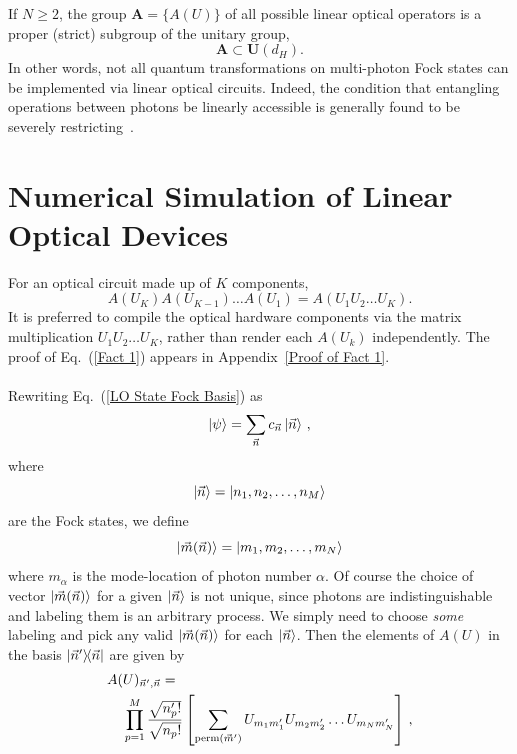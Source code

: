 \documentclass[aps,pra,twocolumn,superscriptaddress,floatfix,10pt]{revtex4}
\begin{document}
If $N \ge 2$, the group $\textbf{A}=\{ A(U) \}$  of all possible linear optical operators is a proper (strict) subgroup of the unitary group,
\begin{equation}
\label{Proper Subgroup}
\textbf{A} \subset \textbf{U}(d_H).
\end{equation}
In other words, not all quantum transformations on multi-photon Fock states can be implemented via linear optical circuits. Indeed, the condition that entangling operations between photons be linearly accessible is  generally found to be severely restricting~\cite{Matt Smith,Braunstein,Jake Smith,Lougovski,Lutkenhaus,Carollo,Pavicic}. 
\section{Numerical Simulation of Linear Optical Devices}
\label{Section on Protocol}
For an optical circuit made up of $K$ components,
\begin{equation}
	\label{Fact 1}
A(U_K) A(U_{K-1}) \dots A(U_1) = A(U_1 U_2 \dots U_K).
\end{equation}
It is preferred to compile the optical hardware components via the matrix multiplication $U_1 U_2 \dots U_K$, rather than render each $A(U_k)$ independently. The proof of Eq.~(\ref{Fact 1}) appears in Appendix~\ref{Proof of Fact 1}.
\\ \\ \indent
Rewriting Eq.~(\ref{LO State Fock Basis}) as
\begin{equation}
\label{LO State Fock Vec Basis}
\ket{\psi} = \sum_{\vec{n}} c_{\vec{n}} \ket{\vec{n}} \,,
\end{equation}
where
\begin{equation}
\ket{\vec{n}} = \ket{n_1,n_2,\dots,n_M}
\end{equation}
are the Fock states, we define
\begin{equation}
\label{m definition}
\ket{\vec{m}(\vec{n})} = \ket{m_1,m_2,\dots,m_N}
\end{equation}
where $m_\alpha$ is the mode-location of photon number $\alpha$. Of course the choice of vector $\ket{\vec{m}(\vec{n})}$ for a given $\ket{\vec{n}}$ is not unique, since photons are indistinguishable and labeling them is an arbitrary process. We simply need to choose \textit{some} labeling and pick any valid $\ket{\vec{m}(\vec{n})}$ for each $\ket{\vec{n}}$. Then the elements of $A(U)$ in the basis $\outerproduct{\vec{n}^\prime}{\vec{n}}$ are given by
\begin{eqnarray}
\label{Fact 2}
A(U)_{\vec{n}^\prime,\vec{n}} = \quad \quad \quad \quad \quad \quad \quad \quad \quad \quad \quad \quad \quad \quad \quad \quad \quad \\ \small \nonumber \prod_{p=1}^{M} \frac{\sqrt{n_p^\prime !}}{\sqrt{n_p !}} \left[\sum_{\textrm{perm}(\vec{m}^\prime)} U_{m_1 m_1^\prime} U_{m_2 m_2^\prime} \dots U_{m_N m_N^\prime} \right] \,, 
\end{eqnarray}
\end{document}
